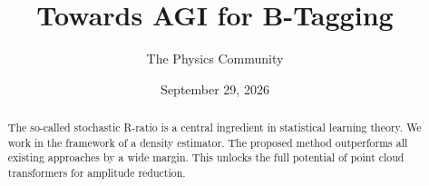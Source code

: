 \documentclass[11pt]{article}
\title{Towards AGI for B-Tagging}
\author{The Physics Community}
\date{September 29, 2026}
\begin{document}
\maketitle
\begin{abstract}
The so-called stochastic R-ratio is a central ingredient in statistical
learning theory. We work in the framework of a density estimator. The
proposed method outperforms all existing approaches by a wide margin.
This unlocks the full potential of point cloud transformers for
amplitude reduction.
\end{abstract}
\tableofcontents




\nocite{*}


\end{document}

